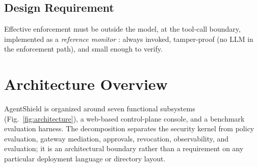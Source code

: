 \documentclass[10pt,conference]{IEEEtran}
\begin{document}
\subsection{Design Requirement}
Effective enforcement must be outside the model, at the tool-call boundary,
implemented as a \emph{reference monitor} \cite{anderson1972computer}: always
invoked, tamper-proof (no LLM in the enforcement path), and small enough to
verify.

\section{Architecture Overview}

AgentShield is organized around seven functional subsystems
(Fig.~\ref{fig:architecture}), a web-based control-plane console, and a
benchmark evaluation harness. The decomposition separates the security
kernel from policy evaluation, gateway mediation, approvals, revocation,
observability, and evaluation; it is an architectural boundary rather than a
requirement on any particular deployment language or directory layout.
\end{document}
